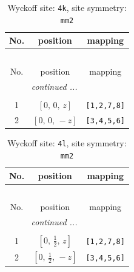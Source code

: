 \documentclass[fleqn,8pt]{jsarticle}
\begin{document}
\renewcommand{\arraystretch}{1.2}
\begin{longtable}{ccc}
\caption{Wyckoff site: {\tt 4k}, site symmetry: {\tt mm2}}
 \\
 \hline \hline
No. & position & mapping \\ \hline \endfirsthead

\multicolumn{2}{l}{\tablename\ \thetable{}} \\
 \hline \hline
No. & position & mapping \\ \hline \endhead

 \hline \hline
\multicolumn{2}{r}{\footnotesize\it continued ...} \\ \endfoot

 \hline \hline
\multicolumn{2}{r}{} \\ \endlastfoot

1 & $\left[ 0,\, 0,\, z \right]$ & {\tt [1,2,7,8]} \\ \hline
2 & $\left[ 0,\, 0,\, - z \right]$ & {\tt [3,4,5,6]} \\
\end{longtable}
\renewcommand{\arraystretch}{1.2}
\begin{longtable}{ccc}
\caption{Wyckoff site: {\tt 4l}, site symmetry: {\tt mm2}}
 \\
 \hline \hline
No. & position & mapping \\ \hline \endfirsthead

\multicolumn{2}{l}{\tablename\ \thetable{}} \\
 \hline \hline
No. & position & mapping \\ \hline \endhead

 \hline \hline
\multicolumn{2}{r}{\footnotesize\it continued ...} \\ \endfoot

 \hline \hline
\multicolumn{2}{r}{} \\ \endlastfoot

1 & $\left[ 0,\, \frac{1}{2},\, z \right]$ & {\tt [1,2,7,8]} \\ \hline
2 & $\left[ 0,\, \frac{1}{2},\, - z \right]$ & {\tt [3,4,5,6]} \\
\end{longtable}
\renewcommand{\arraystretch}{1.2}
\end{document}
